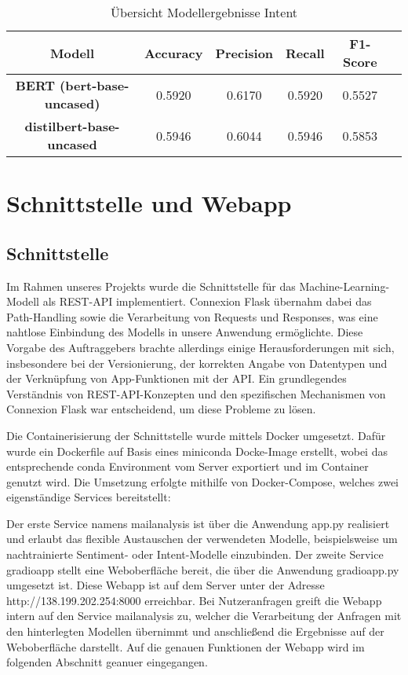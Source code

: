 \begin{table}[H]
\centering
\begin{tabular}{c|c|c|c|c|c}
            \toprule
             \textbf{Modell} & \textbf{Accuracy} & \textbf{Precision} & \textbf{Recall} & \textbf{F1-Score} \\
             \midrule
             \textbf{BERT (bert-base-uncased)} & 0.5920 & 0.6170 & 0.5920 & 0.5527\\
             \textbf{distilbert-base-uncased} & 0.5946 & 0.6044 & 0.5946 & 0.5853  \\
             \bottomrule
\end{tabular}
\caption{Übersicht Modellergebnisse Intent}
\label{tab:Modellergebnisse Intent}
\end{table}


\newpage
\section{Schnittstelle und Webapp}

\subsection{Schnittstelle}

Im Rahmen unseres Projekts wurde die Schnittstelle für das Machine-Learning-Modell als REST-API implementiert.
Connexion Flask übernahm dabei das Path-Handling sowie die Verarbeitung von Requests und Responses, was eine
nahtlose Einbindung des Modells in unsere Anwendung ermöglichte. Diese Vorgabe des Auftraggebers brachte
allerdings einige Herausforderungen mit sich, insbesondere bei der Versionierung, der korrekten Angabe
von Datentypen und der Verknüpfung von App-Funktionen mit der API. Ein grundlegendes Verständnis von
REST-API-Konzepten und den spezifischen Mechanismen von Connexion Flask war entscheidend, um diese Probleme
zu lösen. 

Die Containerisierung der Schnittstelle wurde mittels Docker umgesetzt. Dafür wurde ein
Dockerfile auf Basis eines miniconda Docke-Image erstellt, wobei das entsprechende conda
Environment vom Server exportiert und im Container genutzt wird. Die Umsetzung erfolgte mithilfe
von Docker-Compose, welches zwei eigenständige Services bereitstellt: 

Der erste Service namens mail\textunderscore analysis ist über die Anwendung app.py realisiert und erlaubt
das flexible Austauschen der verwendeten Modelle, beispielsweise um nachtrainierte Sentiment-
oder Intent-Modelle einzubinden. Der zweite Service gradio\textunderscore app stellt eine Weboberfläche bereit,
die über die Anwendung gradio\textunderscore app.py umgesetzt ist. Diese Webapp ist auf dem Server unter der
Adresse http://138.199.202.254:8000 erreichbar. Bei Nutzeranfragen greift die Webapp intern
auf den Service mail\textunderscore analysis zu, welcher die Verarbeitung der Anfragen mit den hinterlegten
Modellen übernimmt und anschließend die Ergebnisse auf der Weboberfläche darstellt. Auf die genauen Funktionen der 
Webapp wird im folgenden Abschnitt geanuer eingegangen. 

